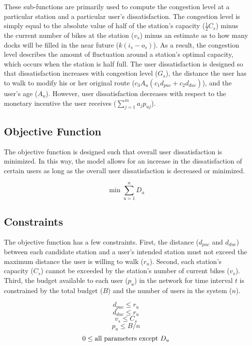 \documentclass[times, 10pt,twocolumn]{article}
\begin{document}
These sub-functions are primarily used to compute the congestion level at a particular station and a particular user's dissatisfaction. The congestion level is simply equal to the absolute value of half of the station's capacity ($\frac{1}{2}C_s$) minus the current number of bikes at the station ($v_s$) minus an estimate as to how many docks will be filled in the near future ($k(i_s - o_s)$). As a result, the congestion level describes the amount of fluctuation around a station's optimal capacity, which occurs when the station is half full. The user dissatisfaction is designed so that dissatisfaction increases with congestion level ($G_s$), the distance the user has to walk to modify his or her original route ($c_3A_u(c_1d_{puc} + c_2d_{duc})$), and the user's age ($A_u$). However, user dissatisfaction decreases with respect to the monetary incentive the user receives ($\sum_{j=1}^{m}a_jp_{uj}$).

\subsection{Objective Function}
 
The objective function is designed such that overall user dissatisfaction is minimized. In this way, the model allows for an increase in the dissatisfaction of certain users as long as the overall user dissatisfaction is decreased or minimized.

\begin{equation}
\min{\sum_{u=1}^{n}D_u}
\end{equation}

\subsection{Constraints}

The objective function has a few constraints. First, the distance ($d_{puc}$ and $d_{duc}$) between each candidate station and a user's intended station must not exceed the maximum distance the user is willing to walk ($r_u$). Second, each station's capacity ($C_s$) cannot be exceeded by the station's number of current bikes ($v_s$). Third, the budget available to each user ($p_u$) in the network for time interval $t$ is constrained by the total budget ($B$) and the number of users in the system ($n$).

\begin{equation}
d_{puc} \leq r_u
\end{equation}
\begin{equation}
d_{duc} \leq r_u
\end{equation}
\begin{equation}
v_s \leq C_s
\end{equation}
\begin{equation}
p_u \leq B/n
\end{equation}
\begin{equation}
0 \leq \textnormal{all parameters except } D_u
\end{equation}
\end{document}
